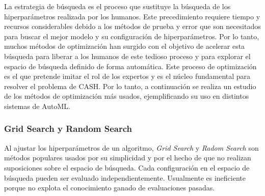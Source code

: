 La estrategia de búsqueda es el proceso que sustituye la búsqueda de los hiperparámetros realizada por los humanos. Este precedimiento requiere tiempo y recursos considerables debido a los métodos de prueba y error que son necesitados para buscar el mejor modelo y su configuración de hiperparámetros. Por lo tanto, muchos métodos de optimización han surgido con el objetivo de acelerar esta búsqueda para liberar a los humanos de este tedioso proceso y para explorar el espacio de búsqueda definido de forma automática. Este proceso de optimización es el que pretende imitar el rol de los expertos y es el núcleo fundamental para resolver el problema de CASH. Por lo tanto, a continuación se realiza un estudio de los métodos de optimización más usados, ejemplificando su uso en distintos sistemas de AutoML.


\subsubsection{Grid Search y Random Search}


Al ajustar los hiperparámetros de un algoritmo, \textit{Grid Search} y \textit{Radom Search} son métodos populares usados por su simplicidad y por el hecho de que no realizan suposiciones sobre el espacio de búsqueda. Cada configuración en el espacio de búsqueda pueden ser evaluado independientemente. Usualmente es ineficiente porque no explota el conocimiento ganado de evaluaciones pasadas.

